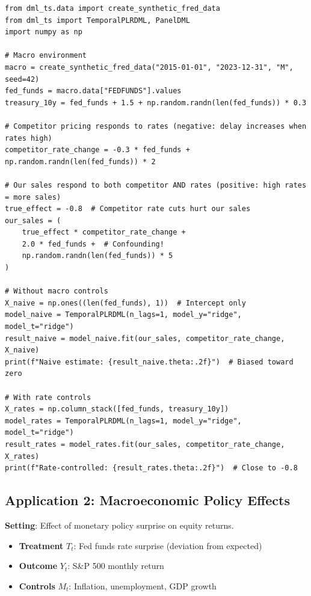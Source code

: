 \begin{verbatim}
from dml_ts.data import create_synthetic_fred_data
from dml_ts import TemporalPLRDML, PanelDML
import numpy as np

# Macro environment
macro = create_synthetic_fred_data("2015-01-01", "2023-12-31", "M", seed=42)
fed_funds = macro.data["FEDFUNDS"].values
treasury_10y = fed_funds + 1.5 + np.random.randn(len(fed_funds)) * 0.3

# Competitor pricing responds to rates (negative: delay increases when rates high)
competitor_rate_change = -0.3 * fed_funds + np.random.randn(len(fed_funds)) * 2

# Our sales respond to both competitor AND rates (positive: high rates = more sales)
true_effect = -0.8  # Competitor rate cuts hurt our sales
our_sales = (
    true_effect * competitor_rate_change +
    2.0 * fed_funds +  # Confounding!
    np.random.randn(len(fed_funds)) * 5
)

# Without macro controls
X_naive = np.ones((len(fed_funds), 1))  # Intercept only
model_naive = TemporalPLRDML(n_lags=1, model_y="ridge", model_t="ridge")
result_naive = model_naive.fit(our_sales, competitor_rate_change, X_naive)
print(f"Naive estimate: {result_naive.theta:.2f}")  # Biased toward zero

# With rate controls
X_rates = np.column_stack([fed_funds, treasury_10y])
model_rates = TemporalPLRDML(n_lags=1, model_y="ridge", model_t="ridge")
result_rates = model_rates.fit(our_sales, competitor_rate_change, X_rates)
print(f"Rate-controlled: {result_rates.theta:.2f}")  # Close to -0.8
\end{verbatim}

\subsection{Application 2: Macroeconomic Policy Effects}

\textbf{Setting}: Effect of monetary policy surprise on equity returns.

\begin{itemize}
    \item \textbf{Treatment} $T_t$: Fed funds rate surprise (deviation from expected)
    \item \textbf{Outcome} $Y_t$: S\&P 500 monthly return
    \item \textbf{Controls} $M_t$: Inflation, unemployment, GDP growth
\end{itemize}

